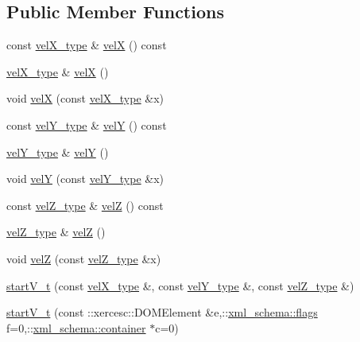 \subsection*{Public Member Functions}
\begin{DoxyCompactItemize}
\item 
const \hyperlink{classstartV__t_aac8a2d74e6be7ae3248ba26d253ad3fc}{vel\-X\-\_\-type} \& \hyperlink{classstartV__t_a4340410f0380ecb35db2eafb18c5fee9}{vel\-X} () const 
\item 
\hyperlink{classstartV__t_aac8a2d74e6be7ae3248ba26d253ad3fc}{vel\-X\-\_\-type} \& \hyperlink{classstartV__t_abaf0997273c09b09572e39e3976f676d}{vel\-X} ()
\item 
void \hyperlink{classstartV__t_a9fa96a1a14b2414de3a69ad945aaf35a}{vel\-X} (const \hyperlink{classstartV__t_aac8a2d74e6be7ae3248ba26d253ad3fc}{vel\-X\-\_\-type} \&x)
\item 
const \hyperlink{classstartV__t_acfa8dd01ff687d610335845945099743}{vel\-Y\-\_\-type} \& \hyperlink{classstartV__t_a0c066d13b456db18bf5306e996e43c07}{vel\-Y} () const 
\item 
\hyperlink{classstartV__t_acfa8dd01ff687d610335845945099743}{vel\-Y\-\_\-type} \& \hyperlink{classstartV__t_a0603b086828b9023554f54ac4a071ead}{vel\-Y} ()
\item 
void \hyperlink{classstartV__t_a1e0a243dc357bd088644e62a81a59f83}{vel\-Y} (const \hyperlink{classstartV__t_acfa8dd01ff687d610335845945099743}{vel\-Y\-\_\-type} \&x)
\item 
const \hyperlink{classstartV__t_ae49f578f0cc0d86f126691188752dfe9}{vel\-Z\-\_\-type} \& \hyperlink{classstartV__t_aba04ae5938c29de72436ed303c3809bd}{vel\-Z} () const 
\item 
\hyperlink{classstartV__t_ae49f578f0cc0d86f126691188752dfe9}{vel\-Z\-\_\-type} \& \hyperlink{classstartV__t_a823df50569f539fc5c285f3879577428}{vel\-Z} ()
\item 
void \hyperlink{classstartV__t_a0b8d6e20780d58af86ce99977de5933a}{vel\-Z} (const \hyperlink{classstartV__t_ae49f578f0cc0d86f126691188752dfe9}{vel\-Z\-\_\-type} \&x)
\item 
\hyperlink{classstartV__t_a399904b82739e84b0e9dced2ee2f7590}{start\-V\-\_\-t} (const \hyperlink{classstartV__t_aac8a2d74e6be7ae3248ba26d253ad3fc}{vel\-X\-\_\-type} \&, const \hyperlink{classstartV__t_acfa8dd01ff687d610335845945099743}{vel\-Y\-\_\-type} \&, const \hyperlink{classstartV__t_ae49f578f0cc0d86f126691188752dfe9}{vel\-Z\-\_\-type} \&)
\item 
\hyperlink{classstartV__t_aba4d6f5c9f7209e5909278629e3c2229}{start\-V\-\_\-t} (const \-::xercesc\-::\-D\-O\-M\-Element \&e,\-::\hyperlink{namespacexml__schema_a0612287d030cb2732d31a45b258fdc87}{xml\-\_\-schema\-::flags} f=0,\-::\hyperlink{namespacexml__schema_ada9aa30dc722e93ee2ed7243085402a5}{xml\-\_\-schema\-::container} $\ast$c=0)

\end{DoxyCompactItemize}
